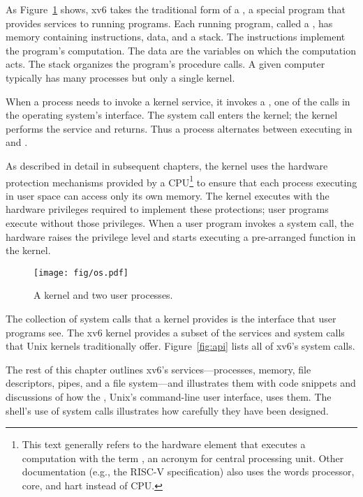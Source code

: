 As
Figure~\ref{fig:os} shows,
xv6 takes the traditional form of a
,
a special program that provides
services to running programs.
Each running program, called a
,
has memory containing instructions, data, and a stack. The
instructions implement the
program's computation.  The data are the variables on which
the computation acts. The stack organizes the program's procedure calls.
A given computer typically has many processes but only a single
kernel.

When a
process needs to invoke a kernel service, it invokes
a ,
one of the calls
in the operating system's interface.
The system call enters the kernel;
the kernel performs the service and returns.
Thus a process alternates between executing in
and
.

As described in detail in subsequent chapters, the kernel uses the hardware protection mechanisms provided by a
CPU\footnote{
This text generally refers to the hardware element that executes a
computation with the term , an acronym for central
processing unit.  Other documentation (e.g., the RISC-V specification)
also uses the words processor, core, and hart instead of CPU.
}
to
ensure that each process executing in user space can access only
its own memory.
The kernel executes with the hardware privileges required to
implement these protections; user programs execute without
those privileges.
When a user program invokes a system call, the hardware
raises the privilege level and starts executing a pre-arranged
function in the kernel.

\begin{figure}[t]
\center
\texttt{[image: fig/os.pdf]}
\caption{A kernel and two user processes.}
\label{fig:os}
\end{figure}

The collection of system calls that a kernel provides
is the interface that user programs see.
The xv6 kernel provides a subset of the services and system calls
that Unix kernels traditionally offer.
Figure~\ref{fig:api}
lists all of xv6's system calls.

The rest of this chapter outlines xv6's services---processes, memory,
file descriptors, pipes, and a file system---and illustrates them with
code snippets and discussions of how the ,
Unix's command-line user interface, uses
them. The shell's use of system calls illustrates how carefully they
have been designed.

